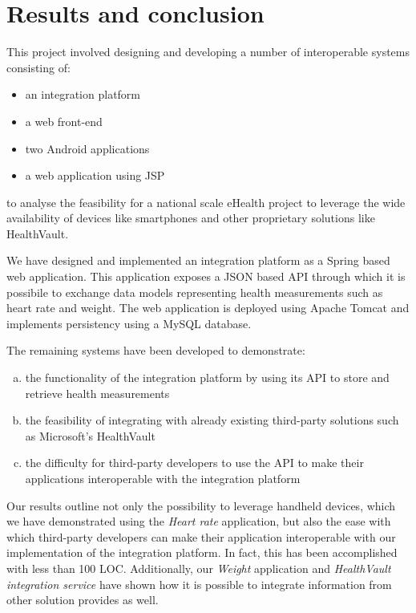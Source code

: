 \chapter{Results and conclusion}
\label{ch:conclusion}



This project involved designing and developing a number of interoperable systems consisting of:
\begin{itemize}
\item an integration platform
\item a web front-end %
\item two Android applications
\item a web application using JSP
\end{itemize}
to analyse the feasibility for a national scale eHealth project to leverage the wide availability of devices like smartphones and other proprietary solutions like HealthVault.

We have designed and implemented an integration platform as a Spring based web application.
This application exposes a JSON based API through which it is possibile to exchange data models representing health measurements such as heart rate and weight.
The web application is deployed using Apache Tomcat and implements persistency using a MySQL database.

\clearpage
The remaining systems have been developed to demonstrate:
\begin{enumerate}[a.]
\item the functionality of the integration platform by using its API to store and retrieve health measurements
\item the feasibility of integrating with already existing third-party solutions such as Microsoft's HealthVault
\item the difficulty for third-party developers to use the API to make their applications interoperable with the integration platform
\end{enumerate}

Our results outline not only the possibility to leverage handheld devices, which we have demonstrated using the \textit{Heart rate} application, but also the ease with which third-party developers can make their application interoperable with our implementation of the integration platform.
In fact, this has been accomplished with less than 100 LOC.
Additionally, our \textit{Weight} application and \textit{HealthVault integration service} have shown how it is possible to integrate information from other solution provides as well.

